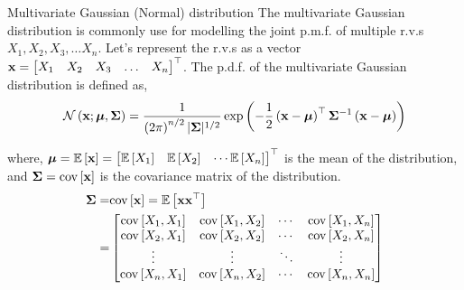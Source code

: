 \documentclass[aspectratio=169]{beamer}
\def\mf{\ensuremath\mathbf}
\def\mb{\ensuremath\mathbb}
\def\mc{\ensuremath\mathcal}
\def\lp{\ensuremath\left(}
\def\rp{\ensuremath\right)}
\def\ls{\ensuremath\left[}
\def\rs{\ensuremath\right]}
\def\bmx{\ensuremath\begin{bmatrix*}[r]}
\def\emx{\ensuremath\end{bmatrix*}}
\def\bmxc{\ensuremath\begin{bmatrix*}[c]}
\newcommand{\ct}[1]{\lp #1\rp}
\newcommand{\dt}[1]{\ls #1\rs}
\begin{document}
\begin{frame}{Multivariate Gaussian (Normal) distribution}
  The multivariate Gaussian distribution is commonly use for modelling the joint p.m.f. of multiple r.v.s $X_1, X_2, X_3, \ldots X_n$. Let's represent the r.v.s as a vector $\mf{x} = \bmx X_1 & X_2 & X_3 & \ldots & X_n \emx^\top$. The p.d.f. of the multivariate Gaussian distribution is defined as,
  \[ \mc{N}\ct{\mf{x}; \bm{\mu}, \bm{\Sigma}} = \frac{1}{\ct{2\pi}^{n/2} \vert \bm{\Sigma} \vert^{1/2}} \exp\ct{-\frac{1}{2}\ct{\mf{x} - \bm{\mu}}^\top\bm{\Sigma}^{-1}\ct{\mf{x} - \bm{\mu}}} \]

  where, $\bm{\mu} = \mb{E}\dt{\mf{x}} = \bmx \mb{E}\dt{X_1} & \mb{E}\dt{X_2} & \cdots \mb{E}\dt{X_n} \emx^\top$ is the mean of the distribution, and $\bm{\Sigma} = \mathrm{cov}\dt{\mf{x}}$ is the covariance matrix of the distribution.
  \[ \begin{split}
    \bm{\Sigma} = &\mathrm{cov}\dt{\mf{x}} = \mb{E}\dt{\mf{x}\mf{x}^\top} \\
    = & \bmxc 
    \mathrm{cov}\dt{X_1, X_1} & \mathrm{cov}\dt{X_1, X_2} & \cdots & \mathrm{cov}\dt{X_1, X_n} \\
    \mathrm{cov}\dt{X_2, X_1} & \mathrm{cov}\dt{X_2, X_2} & \cdots & \mathrm{cov}\dt{X_2, X_n} \\
    \vdots & \vdots & \ddots & \vdots \\ 
    \mathrm{cov}\dt{X_n, X_1} & \mathrm{cov}\dt{X_n, X_2} & \cdots & \mathrm{cov}\dt{X_n, X_n}
    \emx
  \end{split} \]
\end{frame}
\end{document}

